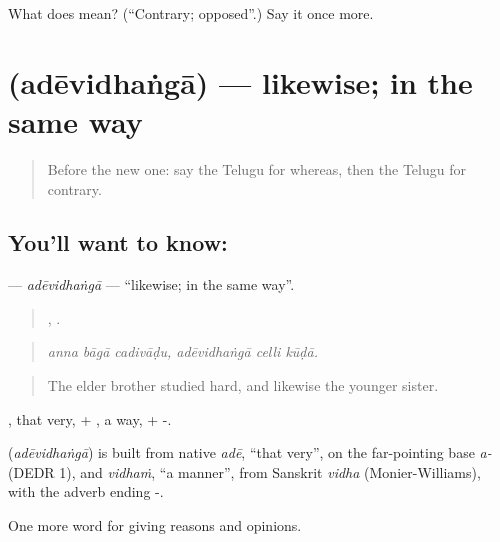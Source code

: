 \begin{tcolorbox}[breakable,colback=teal!4,colframe=teal!35!black,title={Before you move on}]
What does  mean? (\textquotedblleft{}Contrary; opposed\textquotedblright{}.) Say it once more.
\end{tcolorbox}
\section[\texorpdfstring{\te{అదేవిధంగా} (adēvidhaṅgā)}{అదేవిధంగా (adēvidhaṅgā)}]{ (adēvidhaṅgā) — likewise; in the same way}

\label{lesson:TE-C396-adevidhanga}



\begin{quote}
Before the new one: say the Telugu for whereas, then the Telugu for contrary.
\end{quote}

\subsection*{You'll want to know: }
\textbf{} — \emph{adēvidhaṅgā} — \textquotedblleft{}likewise; in the same way\textquotedblright{}.

\begin{quote}
  ,   .
\end{quote}

\begin{quote}
\emph{anna bāgā cadivāḍu, adēvidhaṅgā celli kūḍā.}
\end{quote}

\begin{quote}
The elder brother studied hard, and likewise the younger sister.
\end{quote}

, that very, + , a way, + -.

\begin{cousinweb}
\textbf{} (\emph{adēvidhaṅgā}) is built from native \emph{adē}, \textquotedblleft{}that very\textquotedblright{}, on the far-pointing base \emph{a-} (DEDR 1), and \emph{vidhaṁ}, \textquotedblleft{}a manner\textquotedblright{}, from Sanskrit \emph{vidha} (Monier-Williams), with the adverb ending -.
\end{cousinweb}

\begin{grammarlens}[title={What you've built}]
One more word for giving reasons and opinions.
\end{grammarlens}

